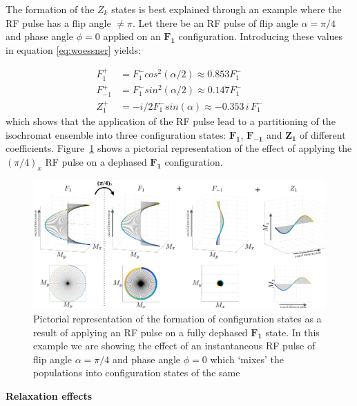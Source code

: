 \hfill

The formation of the $Z_{k}$ states is best explained through an example where the RF pulse has a flip angle $\neq \pi$.
Let there be an RF pulse of flip angle $\alpha = \pi/4$ and phase angle $\phi = 0$ applied on an $\bm{F_1}$ configuration.
Introducing these values in equation \ref{eq:woessner} yields:

\begin{equation}
\begin{split}
    F_{1}^+  &= F_{1}^- cos^2(\alpha/2) \approx 0.853 F_{1}^- \\
    F_{-1}^+ &= F_{1}^- sin^2(\alpha/2) \approx 0.147 F_{1}^-   \\
    Z_{1}^+  &= - i/2 F_{1}^- sin(\alpha)  \approx - 0.353 \, i \, F_{1}^-
\end{split}
\end{equation}
which shows that the application of the RF pulse lead to a partitioning of the isochromat ensemble into three configuration states: $\bm{F_1}$, $\bm{F_{-1}}$ and $\bm{Z_1}$ of different coefficients.
Figure~\ref{fig:RFPulseinEPG} shows a pictorial representation of the effect of applying the $(\pi/4)_x$ RF pulse on a dephased $\bm{F_1}$ configuration.

\begin{figure}[ht]
    \centering
    \includegraphics[angle=0,width=1\textwidth, keepaspectratio]{images/mrf/RFPulseinEPG}
    \caption{Pictorial representation of the formation of configuration states as a result of applying an RF pulse on a fully dephased $\bm{F_1}$ state.
    In this example we are showing the effect of an instantaneous RF pulse of flip angle $\alpha = \pi/4$ and phase angle $\phi = 0$ which `mixes' the populations into configuration states of the same 
    }
    \label{fig:RFPulseinEPG}
\end{figure}

\hfill

\textbf{Relaxation effects} 

